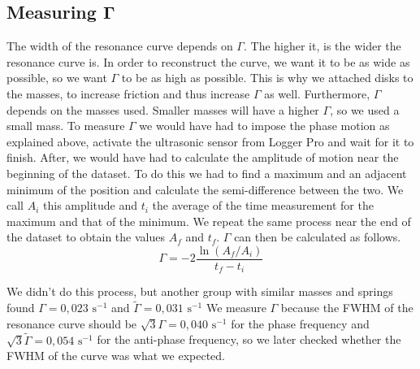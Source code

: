 \documentclass{article}
\begin{document}
\subsection{Measuring $\bm \Gamma$}
The width of the resonance curve depends on $\Gamma$. The higher it, is the wider the resonance curve is. In order to reconstruct the curve, we want it to be as wide as possible, so we want $\Gamma$ to be as high as possible. This is why we attached disks to the masses, to increase friction and thus increase $\Gamma$ as well. Furthermore, $\Gamma$ depends on the masses used. Smaller masses will have a higher $\Gamma$, so we used a small mass. %
To measure $\Gamma$ we would have had to impose the phase motion as explained above, activate the ultrasonic sensor from Logger Pro and wait for it to finish. After, we would have had to calculate the amplitude of motion near the beginning of the dataset. To do this we had to find a maximum and an adjacent minimum of the position and calculate the semi-difference between the two. We call $A_i$ this amplitude and $t_i$ the average of the time measurement for the maximum and that of the minimum. We repeat the same process near the end of the dataset to obtain the values $A_f$ and $t_f$. $\Gamma$ can then be calculated as follows.
\begin{equation}
    \Gamma = -2 \frac{ \ln(A_f / A_i) }{ t_f-t_i }
\end{equation}

We didn't do this process, but another group with similar masses and springs found ${\Gamma = 0,023 \text{ s}^{-1}}$  and $\tilde \Gamma = 0,031  \text{ s}^{-1} $
We measure $\Gamma$ because the FWHM of the resonance curve should be $\sqrt 3 \Gamma = 0,040  \text{ s}^{-1}$ for the phase frequency and $\sqrt 3 \tilde \Gamma = 0,054  \text{ s}^{-1}$ for the anti-phase frequency, so we later checked whether the FWHM of the curve was what we expected. 

\end{document}
